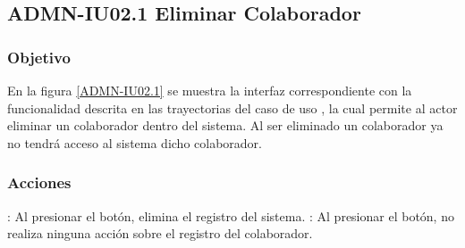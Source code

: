 \clearpage
\subsection{ADMN-IU02.1 Eliminar Colaborador}

\subsubsection{Objetivo}
En la figura \ref{ADMN-IU02.1} se muestra la interfaz correspondiente con la funcionalidad descrita en las
trayectorias del caso de uso  , la cual permite al actor eliminar un colaborador dentro del sistema.
Al ser eliminado un colaborador ya no tendrá acceso al sistema dicho colaborador.

\subsubsection{Acciones}


\Titem {} : Al presionar el botón, elimina el registro del sistema.
\Titem {} : Al presionar el botón, no realiza ninguna acción sobre el registro del colaborador.



\clearpage
